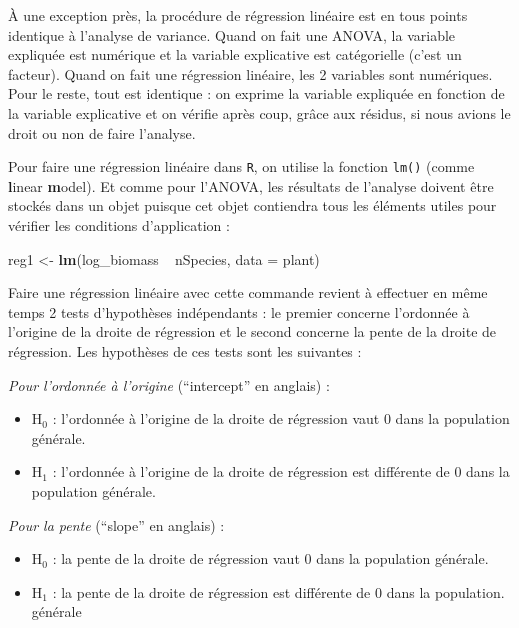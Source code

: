\documentclass[a4paperpaper,]{article}
\newenvironment{Shaded}{\begin{snugshade}}{\end{snugshade}}
\newcommand{\DataTypeTok}[1]{\textcolor[rgb]{0.00,0.34,0.68}{#1}}
\newcommand{\KeywordTok}[1]{\textcolor[rgb]{0.12,0.11,0.11}{\textbf{#1}}}
\newcommand{\NormalTok}[1]{\textcolor[rgb]{0.12,0.11,0.11}{#1}}
\newcommand{\OperatorTok}[1]{\textcolor[rgb]{0.12,0.11,0.11}{#1}}
\newcommand{\StringTok}[1]{\textcolor[rgb]{0.75,0.01,0.01}{#1}}
\providecommand{\tightlist}{%
  \setlength{\itemsep}{0pt}\setlength{\parskip}{0pt}}
\begin{document}
À une exception près, la procédure de régression linéaire est en tous points identique à l'analyse de variance. Quand on fait une ANOVA, la variable expliquée est numérique et la variable explicative est catégorielle (c'est un facteur). Quand on fait une régression linéaire, les 2 variables sont numériques. Pour le reste, tout est identique : on exprime la variable expliquée en fonction de la variable explicative et on vérifie après coup, grâce aux résidus, si nous avions le droit ou non de faire l'analyse.

Pour faire une régression linéaire dans \texttt{R}, on utilise la fonction \texttt{lm()} (comme \textbf{l}inear \textbf{m}odel). Et comme pour l'ANOVA, les résultats de l'analyse doivent être stockés dans un objet puisque cet objet contiendra tous les éléments utiles pour vérifier les conditions d'application :

\begin{Shaded}
\begin{Highlighting}[]
\NormalTok{reg1 <-}\StringTok{ }\KeywordTok{lm}\NormalTok{(log_biomass }\OperatorTok{~}\StringTok{ }\NormalTok{nSpecies, }\DataTypeTok{data =}\NormalTok{ plant)}
\end{Highlighting}
\end{Shaded}

Faire une régression linéaire avec cette commande revient à effectuer en même temps 2 tests d'hypothèses indépendants : le premier concerne l'ordonnée à l'origine de la droite de régression et le second concerne la pente de la droite de régression. Les hypothèses de ces tests sont les suivantes :

\emph{Pour l'ordonnée à l'origine} (``intercept'' en anglais) :

\begin{itemize}
\tightlist
\item
  H\(_0\) : l'ordonnée à l'origine de la droite de régression vaut 0 dans la population générale.
\item
  H\(_1\) : l'ordonnée à l'origine de la droite de régression est différente de 0 dans la population générale.
\end{itemize}

\emph{Pour la pente} (``slope'' en anglais) :

\begin{itemize}
\tightlist
\item
  H\(_0\) : la pente de la droite de régression vaut 0 dans la population générale.
\item
  H\(_1\) : la pente de la droite de régression est différente de 0 dans la population. générale
\end{itemize}
\end{document}
